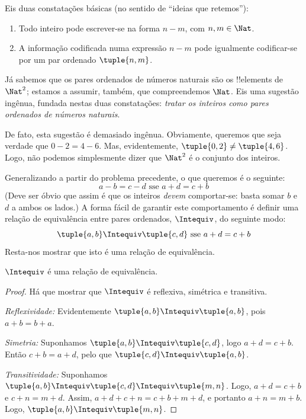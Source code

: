 \documentclass[../../../include/open-logic-section]{subfiles}
\begin{document}

Eis duas constatações básicas (no sentido de ``ideias que retemos''):
	\begin{enumerate}
		\item Todo inteiro pode escrever-se na forma $n - m$, com $n, m \in \Nat$.
		\item A informação codificada numa expressão $n - m$ pode igualmente codificar-se por um par ordenado $\tuple{n, m}$.
	\end{enumerate}
Já sabemos que os pares ordenados de números naturais são os !!{element}s de $\Nat^2$; estamos a assumir, também, que compreendemos $\Nat$. Eis uma sugestão ingênua, fundada nestas duas constatações: \emph{tratar os inteiros como pares ordenados de números naturais}.

De fato, esta sugestão é demasiado ingênua. Obviamente, queremos que seja verdade que $0 - 2 = 4 - 6$. Mas, evidentemente, $\tuple{0, 2} \neq \tuple{4, 6}$. Logo, não podemos simplesmente dizer que $\Nat^2$ é o conjunto dos inteiros.

Generalizando a partir do problema precedente, o que queremos é o seguinte:
	$$a - b = c - d \text{ sse }a + d = c + b$$
(Deve ser óbvio que assim é que os inteiros \emph{devem} comportar-se: basta somar $b$ e $d$ a ambos os lados.) A forma fácil de garantir este comportamento é definir uma relação de equivalência entre pares ordenados, $\Intequiv$, do seguinte modo:
$$\tuple{ a, b } \Intequiv \tuple{c, d}\text{ sse }a + d = c + b$$  
Resta-nos mostrar que isto é uma relação de equivalência.
\begin{prop} $\Intequiv$ é uma relação de equivalência.
\end{prop}
	\begin{proof}
	Há que mostrar que $\Intequiv$ é reflexiva, simétrica e transitiva.
	
	\emph{Reflexividade:} Evidentemente $\tuple{a, b} \Intequiv \tuple{a, b}$, pois $a + b = b + a$.
	
	\emph{Simetria:} Suponhamos $\tuple{a, b} \Intequiv \tuple{c, d}$, logo $a + d = c + b$. Então $c + b = a + d$, pelo que $\tuple{c, d} \Intequiv \tuple{a, b}$.
	
	\emph{Transitividade:} Suponhamos $\tuple{a, b} \Intequiv \tuple{c, d}\Intequiv \tuple{m, n}$. Logo, $a + d = c + b$ e $c + n = m + d$. Assim, $a + d + c + n = c + b + m + d$, e portanto $a + n = m + b$. Logo, $\tuple{a, b} \Intequiv \tuple{m, n}$.
\end{proof}
\end{document}
